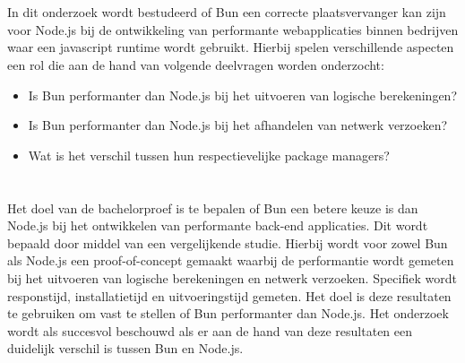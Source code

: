 \section{}%
\label{sec:onderzoeksvraag}

In dit onderzoek wordt bestudeerd of Bun 
een correcte plaatsvervanger kan zijn voor Node.js bij de ontwikkeling van performante webapplicaties binnen bedrijven 
waar een javascript runtime wordt gebruikt.
Hierbij spelen verschillende aspecten een rol die aan de hand van volgende deelvragen worden onderzocht:
\begin{itemize}
  \item Is Bun performanter dan Node.js bij het uitvoeren van logische berekeningen?
  \item Is Bun performanter dan Node.js bij het afhandelen van netwerk verzoeken?
  \item Wat is het verschil tussen hun respectievelijke package managers?
\end{itemize}

\section{}%
\label{sec:onderzoeksdoelstelling}


Het doel van de bachelorproef is te bepalen of Bun een betere keuze is dan Node.js bij het
ontwikkelen van performante back-end applicaties. Dit wordt bepaald door middel van een vergelijkende studie.
Hierbij wordt voor zowel Bun als Node.js een proof-of-concept gemaakt waarbij de performantie wordt gemeten bij het uitvoeren van logische berekeningen 
en netwerk verzoeken. Specifiek wordt responstijd, installatietijd en uitvoeringstijd gemeten. 
Het doel is deze resultaten te gebruiken om vast te stellen of Bun performanter dan Node.js. 
Het onderzoek wordt als succesvol beschouwd als er aan de hand van deze resultaten een duidelijk verschil is tussen Bun en Node.js.
\section{}%
\label{sec:opzet-bachelorproef}


